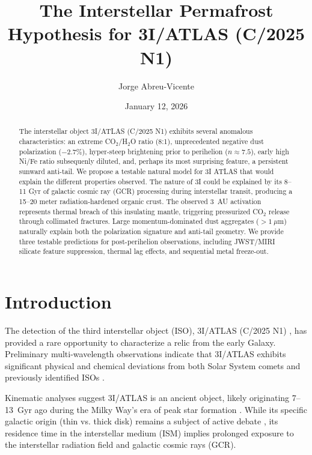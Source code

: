 \documentclass[reprint,aps,prd,noshowpacs]{revtex4-2}
\begin{document}

\title{The Interstellar Permafrost Hypothesis for 3I/ATLAS (C/2025 N1)}

\author{Jorge Abreu-Vicente}

\date{January 12, 2026}

\begin{abstract}
The interstellar object 3I/ATLAS (C/2025 N1) exhibits several anomalous characteristics: an extreme CO$_2$/H$_2$O ratio (8:1), unprecedented negative dust polarization ($-2.7\%$), hyper-steep brightening prior to perihelion ($n \approx 7.5$), early high Ni/Fe ratio subsequenly diluted, and, perhaps its most surprising feature, a persistent sunward anti-tail. We propose a testable natural model for 3I ATLAS that would explain the different properties observed. The nature of 3I could be explained by its  8--11 Gyr of galactic cosmic ray (GCR) processing during interstellar transit, producing a 15--20 meter radiation-hardened organic crust. The observed 3~AU activation represents thermal breach of this insulating mantle, triggering pressurized CO$_2$ release through collimated fractures. Large momentum-dominated dust aggregates ($>1~\mu$m) naturally explain both the polarization signature and anti-tail geometry. We provide three testable predictions for post-perihelion observations, including JWST/MIRI silicate feature suppression, thermal lag effects, and sequential metal freeze-out.
\end{abstract}

\maketitle

\section{Introduction}

The detection of the third interstellar object (ISO), 3I/ATLAS (C/2025 N1) \cite{Bolin_2025,Seligman2025}, has provided a rare opportunity to characterize a relic from the early Galaxy. Preliminary multi-wavelength observations indicate that 3I/ATLAS exhibits significant physical and chemical deviations from both Solar System comets and previously identified ISOs \cite{chandler2025,de_la_Fuente_Marcos_2025,feinstein2025,kareta2025,Santana_Ros_2025,yang2025}.

Kinematic analyses suggest 3I/ATLAS is an ancient object, likely originating 7--13~Gyr ago during the Milky Way’s era of peak star formation \cite{Bolin_2025}. While its specific galactic origin (thin vs. thick disk) remains a subject of active debate \cite{guo2025, perezcouto2025}, its residence time in the interstellar medium (ISM) implies prolonged exposure to the interstellar radiation field and galactic cosmic rays (GCR).
\end{document}
